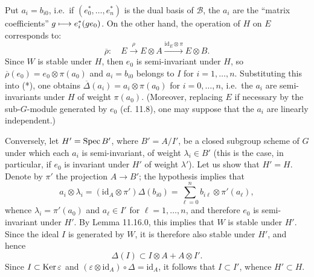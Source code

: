Put $a_i=b_{i0}$, i.e.\ if $(e_0^*,\ldots,e_n^*)$ is the dual basis of $\mathscr B$, the $a_i$ are the ``matrix coefficients'' $g\longmapsto e_i^*(ge_0)$. On the other hand, the operation of $H$ on $E$ corresponds to:
\[
\overline\rho:\quad E\xrightarrow{\rho}E\otimes A\xrightarrow{\mathrm{id}_E\otimes\pi}E\otimes B.
\]
Since $W$ is stable under $H$, then $e_0$ is semi-invariant under $H$, so $\overline\rho(e_0)=e_0\otimes\pi(a_0)$ and $a_i=b_{i0}$ belongs to $I$ for $i=1,\ldots,n$. Substituting this into (*), one obtains $\overline\Delta(a_i)=a_i\otimes\pi(a_0)$ for $i=0,\ldots,n$, i.e.\ the $a_i$ are semi-invariants under $H$ of weight $\pi(a_0)$. (Moreover, replacing $E$ if necessary by the sub-$G$-module generated by $e_0$ (cf. 11.8), one may suppose that the $a_i$ are linearly independent.)

Conversely, let $H'=\operatorname{Spec} B'$, where $B'=A/I'$, be a closed subgroup scheme of $G$ under which each $a_i$ is semi-invariant, of weight $\lambda_i\in B'$ (this is the case, in particular, if $e_0$ is invariant under $H'$ of weight $\lambda'$). Let us show that $H'=H$. Denote by $\pi'$ the projection $A\to B'$; the hypothesis implies that
\[
a_i\otimes\lambda_i=(\mathrm{id}_A\otimes\pi')\Delta(b_{i0})=\sum_{\ell=0}^n b_{i\ell}\otimes\pi'(a_\ell),
\]
whence $\lambda_i=\pi'(a_0)$ and $a_\ell\in I'$ for $\ell=1,\ldots,n$, and therefore $e_0$ is semi-invariant under $H'$. By Lemma 11.16.0, this implies that $W$ is stable under $H'$. Since the ideal $I$ is generated by $W$, it is therefore also stable under $H'$, and hence
\[
\Delta(I)\subset I\otimes A+A\otimes I'.
\]
Since $I\subset\operatorname{Ker}\varepsilon$ and $(\varepsilon\otimes\mathrm{id}_A)\circ\Delta=\mathrm{id}_A$, it follows that $I\subset I'$, whence $H'\subset H$.

